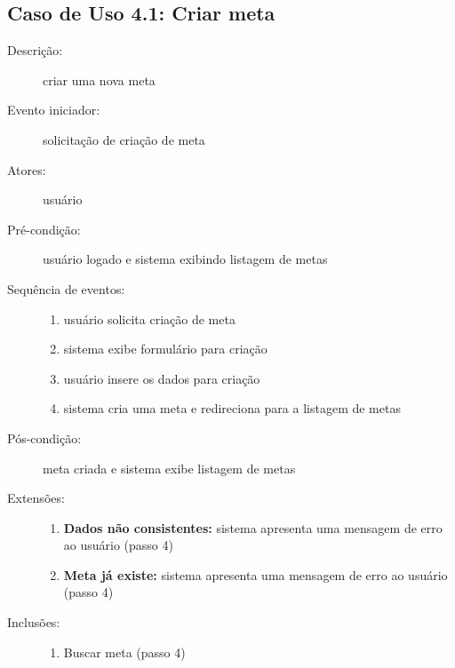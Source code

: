 \subsection{Caso de Uso 4.1: Criar meta}
\begin{description}
	\item[Descrição:] criar uma nova meta
	\item[Evento iniciador:] solicitação de criação de meta
	\item[Atores:] usuário
	\item[Pré-condição:] usuário logado e sistema exibindo listagem de metas
	\item[Sequência de eventos:] \hfill
		\begin{enumerate}
			\item{usuário solicita criação de meta}
			\item{sistema exibe formulário para criação}
			\item{usuário insere os dados para criação}
			\item{sistema cria uma meta e redireciona para a listagem de metas}
		\end{enumerate}
	\item[Pós-condição:] meta criada e sistema exibe listagem de metas
	\item[Extensões:] \hfill
		\begin{enumerate}
			\item{\textbf{Dados não consistentes:} sistema apresenta uma mensagem de erro ao usuário (passo 4)}
			\item{\textbf{Meta já existe:} sistema apresenta uma mensagem de erro ao usuário (passo 4)}
		\end{enumerate}
	\item[Inclusões:] \hfill
		\begin{enumerate}
			\item{Buscar meta (passo 4)}
		\end{enumerate}
\end{description}
%
